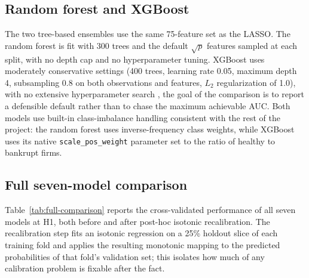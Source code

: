 \documentclass[12pt,a4paper]{article}
\begin{document}
\subsection{Random forest and XGBoost}

The two tree-based ensembles use the same 75-feature set as the LASSO. The
random forest is fit with 300 trees and the default $\sqrt{p}$ features
sampled at each split, with no depth cap and no hyperparameter tuning.
XGBoost uses moderately conservative settings (400 trees, learning rate
0.05, maximum depth 4, subsampling 0.8 on both observations and features,
$L_2$ regularization of 1.0), with no extensive hyperparameter search , 
the goal of the comparison is to report a defensible default rather than to
chase the maximum achievable AUC. Both models use built-in class-imbalance
handling consistent with the rest of the project: the random forest uses
inverse-frequency class weights, while XGBoost uses its native
\texttt{scale\_pos\_weight} parameter set to the ratio of healthy to
bankrupt firms.

\subsection{Full seven-model comparison}

Table~\ref{tab:full-comparison} reports the cross-validated performance of
all seven models at H1, both before and after post-hoc isotonic
recalibration. The recalibration step fits an isotonic regression on a 25\%
holdout slice of each training fold and applies the resulting monotonic
mapping to the predicted probabilities of that fold's validation set; this
isolates how much of any calibration problem is fixable after the fact.
\end{document}
